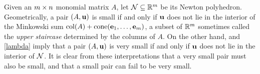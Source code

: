 \documentclass{amsart}
\begin{document}
\begin{remark}
\label{geometric small and very small: R}
Given an $m \times n$ monomial matrix $A$, let $\mathcal{N} \subseteq \mathbb{R}^{m}$ be its Newton polyhedron.
Geometrically, a pair $(A, \mathbf{u})$ is small if and only if $\mathbf{u}$ does not lie in the interior of the Minkowski sum $\operatorname{col}(A) + \operatorname{cone}(\mathbf{e}_1,\ldots,\mathbf{e}_m)$, a subset of $\mathbb{R}^{m}$ sometimes called the \emph{upper staircase} determined by the columns of $A$.
On the other hand,  and \eqref{lambda} imply that a pair $(A, \mathbf{u})$ is very small if and only if $\mathbf{u}$ does not lie in the interior of $\mathcal{N}$.
It is clear from these interpretations that a very small pair must also be small, and that a small pair can fail to be very small.  %
\end{remark}
\end{document}
